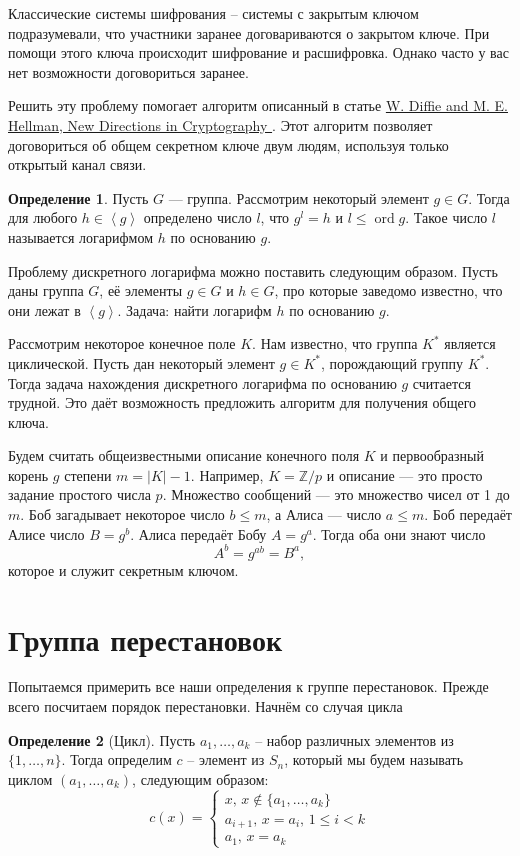 \documentclass[10pt,a4paper,oneside]{book}
\theoremstyle{definition}
\newtheorem*{defn}{\color{yellow!30!red} Определение}
\renewcommand{\leq}{\leqslant}
\newcommand{\mb}[1]{\mathbb{#1}}
\newcommand{\ord}{\operatorname{ord}}
\def\lan{\left\langle }
\def\ran{\right\rangle}
\def\dfn{\begin{defn}}
\def\edfn{\end{defn}}
\begin{document}
Классические системы шифрования -- системы с закрытым ключом подразумевали, что участники заранее договариваются о закрытом ключе. При помощи этого ключа происходит шифрование и расшифровка. Однако часто у вас нет возможности договориться заранее. 

Решить эту проблему помогает алгоритм описанный в статье \href{https://www-ee.stanford.edu/~hellman/publications/24.pdf}{W. Diffie and M. E. Hellman, New Directions in Cryptography }. Этот алгоритм позволяет договориться об общем секретном ключе двум людям, используя только открытый канал связи.

\dfn
Пусть $G$ --- группа. Рассмотрим некоторый элемент $g\in G$. Тогда для любого $h\in \lan g\ran$ определено число $l$, что $g^l=h$ и $l\leq \ord g$. Такое число $l$ называется логарифмом $h$ по основанию $g$.
\edfn

Проблему дискретного логарифма можно поставить следующим образом. Пусть даны группа $G$, её элементы $g\in G$ и $h\in G$, про которые заведомо известно, что они лежат в $\lan g\ran$. Задача: найти логарифм $h$ по основанию $g$.


Рассмотрим некоторое конечное поле $K$. Нам известно, что группа $K^*$ является циклической. Пусть дан некоторый элемент $g\in K^*$, порождающий группу $K^*$. Тогда задача нахождения дискретного логарифма по основанию $g$ считается трудной. Это даёт возможность предложить  алгоритм для получения общего ключа.

Будем считать общеизвестными описание конечного поля $K$ и первообразный корень $g$ степени $m=|K|-1$. Например, $K=\mb Z/p$ и описание --- это просто задание простого числа $p$. Множество сообщений --- это множество чисел от 1 до $m$. Боб загадывает некоторое число $b\leq m$, а Алиса --- число $a\leq m$. Боб передаёт Алисе число $B=g^b$. Алиса передаёт Бобу $A=g^a$. Тогда оба они знают число 
$$A^b=g^{ab}=B^a,$$
которое и служит секретным ключом.
 

\section{Группа перестановок}

Попытаемся примерить все наши определения к группе перестановок. Прежде всего посчитаем порядок перестановки. Начнём со случая цикла


\dfn[Цикл] Пусть $a_1,\dots,a_k$ -- набор различных элементов из $\{1,\dots,n\}$. Тогда определим $c$ -- элемент из $S_n$, который мы будем называть циклом $(a_1,\dots,a_k)$, следующим образом:
$$c(x)=\begin{cases}
x,\, x \notin \{a_1,\dots,a_k\}\\
a_{i+1},\, x=a_i,\, 1\leq i < k\\
a_1,\, x=a_k
\end{cases}$$
\edfn
\end{document}
